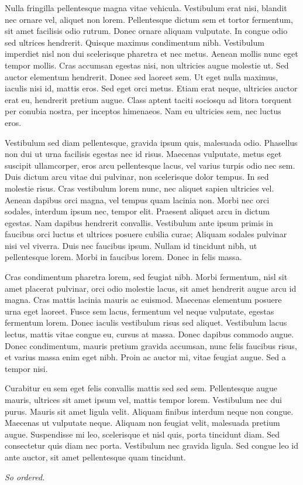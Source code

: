 \documentclass[11pt,twoside]{article}
\begin{document}
Nulla fringilla pellentesque magna vitae vehicula. Vestibulum erat nisi, blandit nec ornare vel, aliquet non lorem. Pellentesque dictum sem et tortor fermentum, sit amet facilisis odio rutrum. Donec ornare aliquam vulputate. In congue odio sed ultrices hendrerit. Quisque maximus condimentum nibh. Vestibulum imperdiet nisl non dui scelerisque pharetra et nec metus. Aenean mollis nunc eget tempor mollis. Cras accumsan egestas nisi, non ultricies augue molestie ut. Sed auctor elementum hendrerit. Donec sed laoreet sem. Ut eget nulla maximus, iaculis nisi id, mattis eros. Sed eget orci metus. Etiam erat neque, ultricies auctor erat eu, hendrerit pretium augue. Class aptent taciti sociosqu ad litora torquent per conubia nostra, per inceptos himenaeos. Nam eu ultricies sem, nec luctus eros.

Vestibulum sed diam pellentesque, gravida ipsum quis, malesuada odio. Phasellus non dui ut urna facilisis egestas nec id risus. Maecenas vulputate, metus eget suscipit ullamcorper, eros arcu pellentesque lacus, vel varius turpis odio nec sem. Duis dictum arcu vitae dui pulvinar, non scelerisque dolor tempus. In sed molestie risus. Cras vestibulum lorem nunc, nec aliquet sapien ultricies vel. Aenean dapibus orci magna, vel tempus quam lacinia non. Morbi nec orci sodales, interdum ipsum nec, tempor elit. Praesent aliquet arcu in dictum egestas. Nam dapibus hendrerit convallis. Vestibulum ante ipsum primis in faucibus orci luctus et ultrices posuere cubilia curae; Aliquam sodales pulvinar nisi vel viverra. Duis nec faucibus ipsum. Nullam id tincidunt nibh, ut pellentesque lorem. Morbi in faucibus lorem. Donec in felis massa.

Cras condimentum pharetra lorem, sed feugiat nibh. Morbi fermentum, nisl sit amet placerat pulvinar, orci odio molestie lacus, sit amet hendrerit augue arcu id magna. Cras mattis lacinia mauris ac euismod. Maecenas elementum posuere urna eget laoreet. Fusce sem lacus, fermentum vel neque vulputate, egestas fermentum lorem. Donec iaculis vestibulum risus sed aliquet. Vestibulum lacus lectus, mattis vitae congue eu, cursus at massa. Donec dapibus commodo augue. Donec condimentum, mauris pretium gravida accumsan, nunc felis faucibus risus, et varius massa enim eget nibh. Proin ac auctor mi, vitae feugiat augue. Sed a tempor nisi.

Curabitur eu sem eget felis convallis mattis sed sed sem. Pellentesque augue mauris, ultrices sit amet ipsum vel, mattis tempor lorem. Vestibulum nec dui purus. Mauris sit amet ligula velit. Aliquam finibus interdum neque non congue. Maecenas ut vulputate neque. Aliquam non feugiat velit, malesuada pretium augue. Suspendisse mi leo, scelerisque et nisl quis, porta tincidunt diam. Sed consectetur quis diam nec porta. Vestibulum nec gravida ligula. Sed congue leo id ante auctor, sit amet pellentesque quam tincidunt. 


\bigskip
{\flushright \itshape So ordered.\par}
\end{document}
